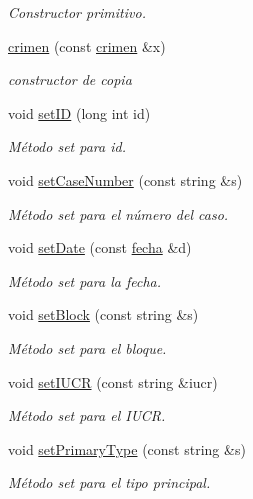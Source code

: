\begin{DoxyCompactItemize}
\begin{DoxyCompactList}\small\item\em Constructor primitivo. \end{DoxyCompactList}\item 
\hyperlink{classcrimen_a50b783e821c2f5bc829eceb9048c12d7}{crimen} (const \hyperlink{classcrimen}{crimen} \&x)
\begin{DoxyCompactList}\small\item\em constructor de copia \end{DoxyCompactList}\item 
void \hyperlink{classcrimen_a6ce53b3c8c9fa745cc745b41b7a8e9bd}{set\-I\-D} (long int id)
\begin{DoxyCompactList}\small\item\em Método set para id. \end{DoxyCompactList}\item 
void \hyperlink{classcrimen_a98ee8c42a0ec09c704c5f17e812a6bd5}{set\-Case\-Number} (const string \&s)
\begin{DoxyCompactList}\small\item\em Método set para el número del caso. \end{DoxyCompactList}\item 
void \hyperlink{classcrimen_ac308c139bb8b599a7badbecd91bfbc5a}{set\-Date} (const \hyperlink{classfecha}{fecha} \&d)
\begin{DoxyCompactList}\small\item\em Método set para la fecha. \end{DoxyCompactList}\item 
void \hyperlink{classcrimen_a9f9b156d6afdf678d542f8309b1c00be}{set\-Block} (const string \&s)
\begin{DoxyCompactList}\small\item\em Método set para el bloque. \end{DoxyCompactList}\item 
void \hyperlink{classcrimen_a1928fd731954aed4a88d8b76f8e005f3}{set\-I\-U\-C\-R} (const string \&iucr)
\begin{DoxyCompactList}\small\item\em Método set para el I\-U\-C\-R. \end{DoxyCompactList}\item 
void \hyperlink{classcrimen_a959223f59be38a0cdb28ea29f294f1d3}{set\-Primary\-Type} (const string \&s)
\begin{DoxyCompactList}\small\item\em Método set para el tipo principal. \end{DoxyCompactList}\item 

\end{DoxyCompactItemize}
